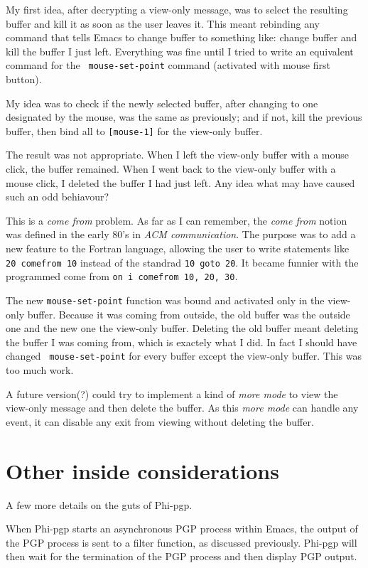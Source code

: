 My first idea, after decrypting a view-only message, was to select the
resulting buffer and kill it as soon as the user leaves it. This meant
rebinding any  command that tells Emacs  to change buffer to something
like: change buffer and  kill the buffer  I just left. Everything  was
fine  until  I tried  to   write an equivalent   command for  the {\tt
mouse-set-point} command (activated with mouse first button).

My idea was to check  if the newly  selected buffer, after changing to
one designated by the mouse, was the same as previously;  and if
not, kill  the previous buffer,  then bind  all to {\tt  [mouse-1]} for
the view-only buffer.

The result was not appropriate. When  I left the view-only buffer with
a mouse click, the buffer remained.  When I went back to the view-only
buffer with a mouse click, I deleted  the buffer I  had just left. Any
idea what may have caused such an odd behiavour?

This is a {\it come from} problem. As far as  I can remember, the {\it
come  from} notion   was   defined in  the   early 80's  in  {\it  ACM
communication}. The purpose was  to add a  new feature to  the Fortran
language,  allowing  the   user    to   write statements   like   {\tt
20~comefrom~10} instead of  the  standrad {\tt 10~goto~20}.  It became
funnier with the programmed come from {\tt on~i~comefrom~10,~20,~30}.

The new {\tt mouse-set-point} function was bound and activated only in
the view-only  buffer. Because it  was  coming from  outside, the  old
buffer was   the  outside   one    and the  new  one   the   view-only
buffer. Deleting the old buffer meant deleting the buffer I was coming
from, which is exactely what I did. In fact I should have changed {\tt
mouse-set-point}  for every buffer  except the  view-only buffer. This
was too much work.

A future version(?)  could try to implement  a kind of {\it more mode}
to view the view-only message and then delete the buffer. As this {\it
more mode} can handle any event, it  can disable any exit from viewing
without deleting the buffer.

\section{Other inside considerations}

A few more details on the guts of Phi-pgp.

When  Phi-pgp starts  an asynchronous PGP  process   within Emacs, the
output of the PGP  process is sent to a  filter function, as discussed
previously. Phi-pgp   will then wait  for  the termination  of the PGP
process and then display PGP output.

